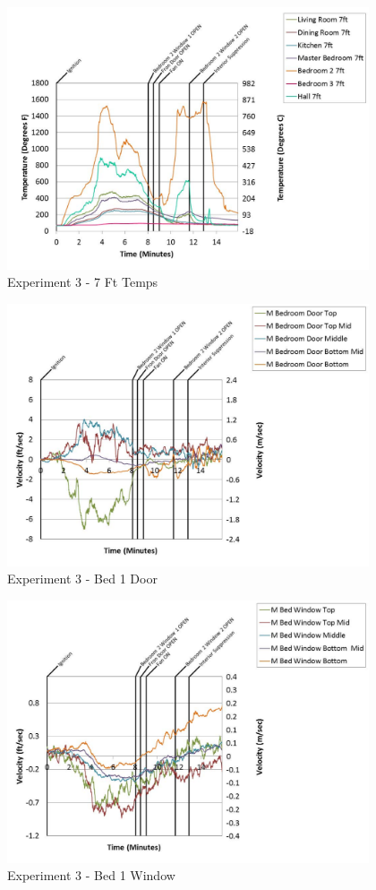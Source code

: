 \documentclass{article}
\begin{document}
\begin{appendices}
	\begin{figure}[h!]
		\centering
		\includegraphics[height=3.05in]{0_Images/Results_Charts/Exp_3_Charts/7FtTemps.pdf}
		\caption{Experiment 3 - 7 Ft Temps}
	\end{figure}
 
	\clearpage

	\begin{figure}[h!]
		\centering
		\includegraphics[height=3.05in]{0_Images/Results_Charts/Exp_3_Charts/Bed1Door.pdf}
		\caption{Experiment 3 - Bed 1 Door}
	\end{figure}
 

	\begin{figure}[h!]
		\centering
		\includegraphics[height=3.05in]{0_Images/Results_Charts/Exp_3_Charts/Bed1Window.pdf}
		\caption{Experiment 3 - Bed 1 Window}
	\end{figure}
 

\end{appendices}
\end{document}
